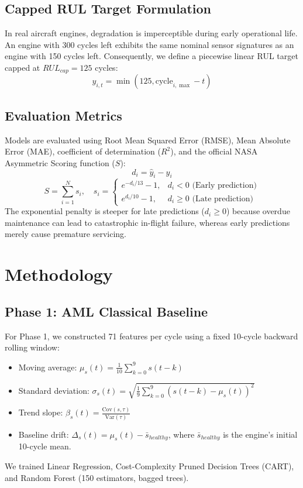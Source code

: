 \documentclass[conference]{IEEEtran}
\begin{document}
\subsection{Capped RUL Target Formulation}
In real aircraft engines, degradation is imperceptible during early operational life. An engine with 300 cycles left exhibits the same nominal sensor signatures as an engine with 150 cycles left. Consequently, we define a piecewise linear RUL target capped at $RUL_{cap} = 125$ cycles:
\begin{equation}
y_{i,t} = \min\left(125, \text{cycle}_{i,\max} - t\right)
\end{equation}

\subsection{Evaluation Metrics}
Models are evaluated using Root Mean Squared Error (RMSE), Mean Absolute Error (MAE), coefficient of determination ($R^2$), and the official NASA Asymmetric Scoring function ($S$):
\begin{equation}
d_i = \hat{y}_i - y_i
\end{equation}
\begin{equation}
S = \sum_{i=1}^{N} s_i, \quad s_i = \begin{cases} 
e^{-d_i/13} - 1, & d_i < 0 \text{ (Early prediction)} \\
e^{d_i/10} - 1, & d_i \ge 0 \text{ (Late prediction)}
\end{cases}
\end{equation}
The exponential penalty is steeper for late predictions ($d_i \ge 0$) because overdue maintenance can lead to catastrophic in-flight failure, whereas early predictions merely cause premature servicing.

\section{Methodology}
\subsection{Phase 1: AML Classical Baseline}
For Phase 1, we constructed 71 features per cycle using a fixed 10-cycle backward rolling window:
\begin{itemize}
    \item Moving average: $\mu_s(t) = \frac{1}{10}\sum_{k=0}^9 s(t-k)$
    \item Standard deviation: $\sigma_s(t) = \sqrt{\frac{1}{9}\sum_{k=0}^9 (s(t-k) - \mu_s(t))^2}$
    \item Trend slope: $\beta_s(t) = \frac{\text{Cov}(s, \tau)}{\text{Var}(\tau)}$
    \item Baseline drift: $\Delta_s(t) = \mu_s(t) - \bar{s}_{healthy}$, where $\bar{s}_{healthy}$ is the engine's initial 10-cycle mean.
\end{itemize}
We trained Linear Regression, Cost-Complexity Pruned Decision Trees (CART), and Random Forest (150 estimators, bagged trees).
\end{document}
